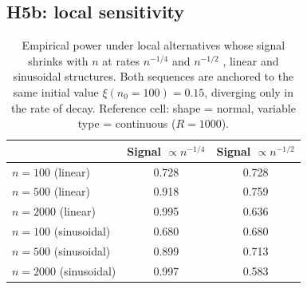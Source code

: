 \documentclass[article]{ajs}
\begin{document}
\subsection{H5b: local sensitivity}

\begin{table}[H]
\caption{\label{tab:h5b}Empirical power under local alternatives whose signal shrinks with $n$ at rates $n^{-1/4}$ and $n^{-1/2}$ \citep{auddy2024}, linear and sinusoidal structures. Both sequences are anchored to the same initial value $\xi(n_0{=}100)=0.15$, diverging only in the rate of decay. Reference cell: shape = normal, variable type = continuous ($R=1000$).}
\begin{center}
\begin{tabular}{lcc}
\toprule
 & Signal $\propto n^{-1/4}$ & Signal $\propto n^{-1/2}$ \\
\midrule
$n=100$ (linear)    & 0.728 & 0.728 \\
$n=500$ (linear)    & 0.918 & 0.759 \\
$n=2000$ (linear)   & 0.995 & 0.636 \\
$n=100$ (sinusoidal)  & 0.680 & 0.680 \\
$n=500$ (sinusoidal)  & 0.899 & 0.713 \\
$n=2000$ (sinusoidal) & 0.997 & 0.583 \\
\bottomrule
\end{tabular}
\end{center}
\end{table}
\end{document}
